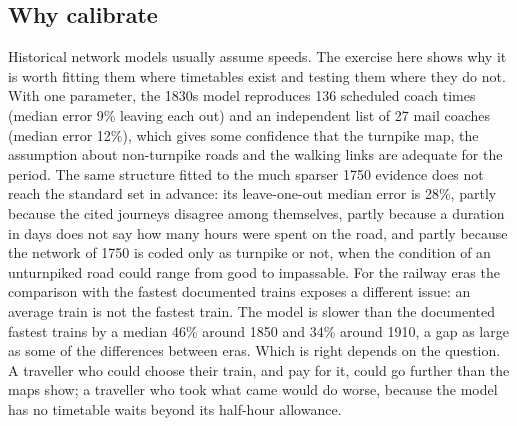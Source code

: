 \documentclass[11pt,a4paper]{article}
\begin{document}
\subsection{Why calibrate}
Historical network models usually assume speeds. The exercise here shows why it is worth fitting them where timetables exist and testing them where they do not. With one parameter, the 1830s model reproduces 136 scheduled coach times (median error 9\% leaving each out) and an independent list of 27 mail coaches (median error 12\%), which gives some confidence that the turnpike map, the assumption about non-turnpike roads and the walking links are adequate for the period. The same structure fitted to the much sparser 1750 evidence does not reach the standard set in advance: its leave-one-out median error is 28\%, partly because the cited journeys disagree among themselves, partly because a duration in days does not say how many hours were spent on the road, and partly because the network of 1750 is coded only as turnpike or not, when the condition of an unturnpiked road could range from good to impassable. For the railway eras the comparison with the fastest documented trains exposes a different issue: an average train is not the fastest train. The model is slower than the documented fastest trains by a median 46\% around 1850 and 34\% around 1910, a gap as large as some of the differences between eras. Which is right depends on the question. A traveller who could choose their train, and pay for it, could go further than the maps show; a traveller who took what came would do worse, because the model has no timetable waits beyond its half-hour allowance.
\end{document}
